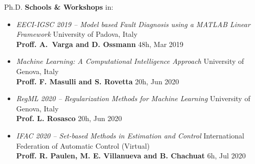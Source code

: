 \documentclass[10pt]{article}
\begin{document}
Ph.D. \textbf{Schools \& Workshops} in:
\begin{itemize}
	\setlength\itemsep{-6pt}
	\renewcommand\labelitemi{$\vcenter{\hbox{\tiny$\bullet$}}$}

	\item \textit{EECI-IGSC 2019 -- Model based Fault Diagnosis using a MATLAB Linear Framework} \hfill University of Padova, Italy\\
	\textbf{Proff. A. Varga and D. Ossmann} \hfill 48h, Mar 2019\\

	\item \textit{Machine Learning: A Computational Intelligence Approach} \hfill University of Genova, Italy\\
	\textbf{Proff. F. Masulli and S. Rovetta} \hfill 20h, Jun 2020\\
	
	\item \textit{RegML 2020 -- Regularization Methods for Machine Learning} \hfill University of Genova, Italy\\
	\textbf{Prof. L. Rosasco} \hfill 20h, Jun 2020\\

	\item \textit{IFAC 2020 -- Set-based Methods in Estimation and Control} \hfill International Federation of Automatic Control (Virtual)\\
	\textbf{Proff. R. Paulen, M. E. Villanueva and B. Chachuat} \hfill 6h, Jul 2020\\



\end{itemize}

\vspace{6pt} %
\end{document}
